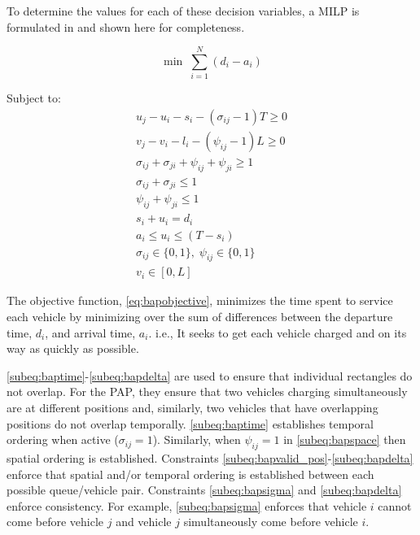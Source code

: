\documentclass[utf8]{FrontiersinHarvard}
\let\cite\citep                                       %
\begin{document}
To determine the values for each of these decision variables, a MILP is formulated in \cite{qarebagh-2019-optim-sched}
and shown here for completeness.

\begin{equation}
	\label{eq:bapobjective}
	\min\; \sum_{i=1}^N (d_i - a_i)
\end{equation}

Subject to:
\begin{subequations}
\label{eq:bapconstrs}
\begin{align}
    u_j - u_i - s_i - (\sigma_{ij} - 1)T \geq 0                  \label{subeq:baptime}          \\
    v_j - v_i - l_i - (\psi_{ij} - 1)L \geq 0                \label{subeq:bapspace}           \\
    \sigma_{ij} + \sigma_{ji} + \psi_{ij} + \psi_{ji} \geq 1 \label{subeq:bapvalid_pos}     \\
    \sigma_{ij} + \sigma_{ji} \leq 1                              \label{subeq:bapsigma}        \\
    \psi_{ij} + \psi_{ji} \leq 1                              \label{subeq:bapdelta}        \\
    s_i + u_i = d_i                                               \label{subeq:bapdetach}       \\
    a_i \leq u_i \leq (T - s_i)                                   \label{subeq:bapvalid_starts} \\
    \sigma_{ij} \in \{0,1\},\;\psi_{ij} \in \{0,1\}\;           \label{subeq:bapsdspace}      \\
    v_i \in [0, L ]                                               \label{subeq:bapvspace}
\end{align}
\end{subequations}

\noindent

The objective function, \autoref{eq:bapobjective}, minimizes the time spent to service each vehicle by minimizing over
the sum of differences between the departure time, \(d_i\), and arrival time, \(a_i\). i.e., It seeks to get each vehicle
charged and on its way as quickly as possible.

\autoref{subeq:baptime}-\autoref{subeq:bapdelta} are used to ensure that individual rectangles do not overlap. For the
PAP, they ensure that two vehicles charging simultaneously are at different positions and, similarly, two vehicles that
have overlapping positions do not overlap temporally. \autoref{subeq:baptime} establishes temporal ordering when active
(\(\sigma_{ij}=1\)). Similarly, when \(\psi_{ij} =1\) in \autoref{subeq:bapspace} then spatial ordering is established. Constraints
\autoref{subeq:bapvalid_pos}-\autoref{subeq:bapdelta} enforce that spatial and/or temporal ordering is established
between each possible queue/vehicle pair. Constraints \autoref{subeq:bapsigma} and \autoref{subeq:bapdelta} enforce
consistency. For example, \autoref{subeq:bapsigma} enforces that vehicle \(i\) cannot come before vehicle \(j\) and vehicle
\(j\) simultaneously come before vehicle \(i\).
\end{document}
